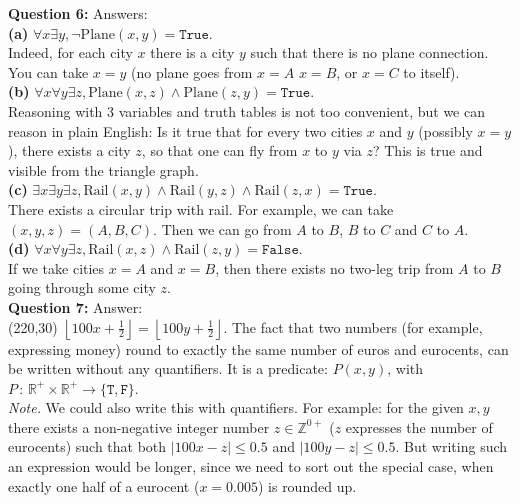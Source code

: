 \documentclass[jou]{apa6}
\begin{document}
\vspace{10pt}
{\bf Question 6:} Answers:\\
{\bf (a)} $\forall x \exists y, \neg \mathrm{Plane}(x,y) = \mathtt{True}$.\\
Indeed, for each city $x$ there is a city $y$ such that there is no plane connection. You can take $x = y$ (no 
plane goes from $x = A$ $x=B$, or $x=C$ to itself).\\
{\bf (b)} $\forall x \forall y \exists z, \mathrm{Plane}(x,z) \wedge \mathrm{Plane}(z,y)  = \mathtt{True}$.\\
Reasoning with $3$ variables and truth tables is not too convenient, but we can reason in plain English:
Is it true that for every two cities $x$ and $y$ (possibly $x = y$), there exists a city $z$, so that
one can fly from $x$ to $y$ via $z$? This is true and visible from the triangle graph.\\
{\bf (c)} $\exists x \exists y \exists z, \mathrm{Rail}(x,y) \wedge \mathrm{Rail}(y,z) \wedge \mathrm{Rail}(z,x) = \mathtt{True}$.\\
There exists a circular trip with rail. For example, we can take $(x,y,z) = (A,B,C)$. Then we can go from $A$ to $B$, 
$B$ to $C$ and $C$ to $A$.\\
{\bf (d)} $\forall x \forall y \exists z, \mathrm{Rail}(x,z) \wedge \mathrm{Rail}(z,y)= \mathtt{False}$.\\
If we take cities $x = A$ and $x = B$, then there exists no two-leg trip from $A$ to $B$ going through some city $z$.\\

\vspace{10pt}
{\bf Question 7:} Answer:\\[5pt]
\framebox(220,30){
${\displaystyle \left\lfloor 100x + \frac{1}{2} \right\rfloor = \left\lfloor 100y + \frac{1}{2} \right\rfloor}$. 
}
The fact that two numbers (for example, expressing money) round to exactly the same number
of euros and eurocents, can be written without any quantifiers. It is a predicate:
$P(x,y)$, with $P\,:\,\mathbb{R}^{+} \times \mathbb{R}^{+} \rightarrow \{ \mathtt{T},\mathtt{F} \}$.\\
{\em Note.} We could also write this with quantifiers. For example:
for the given $x,y$ there exists a non-negative integer number $z \in \mathbb{Z}^{0+}$ ($z$ expresses 
the number of eurocents) such that both $\left| 100x - z \right| \leq 0.5$ and $\left| 100y - z \right| \leq 0.5$. 
But writing such an expression would be longer, since we need to sort out the special case, when 
exactly one half of a eurocent ($x = 0.005$) is rounded up.
\end{document}
